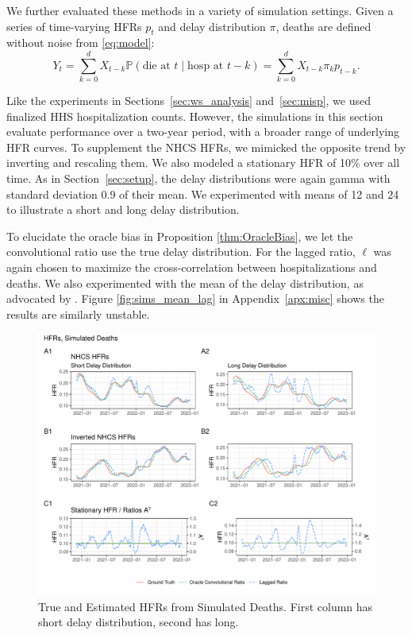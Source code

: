\documentclass{article}
\newcommand{\given}{\; \vert \;}
\begin{document}
We further evaluated these methods in a variety of simulation settings. Given a series of time-varying HFRs $p_t$ and delay distribution $\pi$, deaths are defined without noise from \eqref{eq:model}:
$$Y_t = \sum_{k=0}^d X_{t-k} \mathbb{P}(\text{die at $t$}\given\text{hosp at }t-k) = \sum_{k=0}^d X_{t-k} \pi_k p_{t-k}.$$

Like the experiments in Sections~\ref{sec:ws_analysis} and~\ref{sec:misp}, we
used finalized HHS hospitalization counts. However, the simulations in this
section evaluate performance over a two-year period, with a broader range of
underlying HFR curves. To supplement the NHCS HFRs, we mimicked the opposite
trend by inverting and rescaling them. We also modeled a stationary HFR of 10\%
over all time. As in Section~\ref{sec:setup}, the delay distributions were again
gamma with standard deviation 0.9 of their mean. We experimented with means of
12 and 24 to illustrate a short and long delay distribution. 

To elucidate the oracle bias in Proposition \ref{thm:OracleBias}, we let the convolutional ratio use the true delay distribution. For the lagged ratio, $\ell$ was again chosen to maximize the cross-correlation between hospitalizations and deaths. We also experimented with the mean of the delay distribution, as advocated by \citet{lagged_chinese}. Figure \ref{fig:sims_mean_lag} in Appendix~\ref{apx:misc} shows the results are similarly unstable.


\begin{figure}
    \centering
    \includegraphics[width=\linewidth]{Figs/Simulated/simulated_results.pdf}
    \caption{True and Estimated HFRs from Simulated Deaths. First column has short delay distribution, second has long.}
    \label{fig:sims}
\end{figure}
\end{document}
